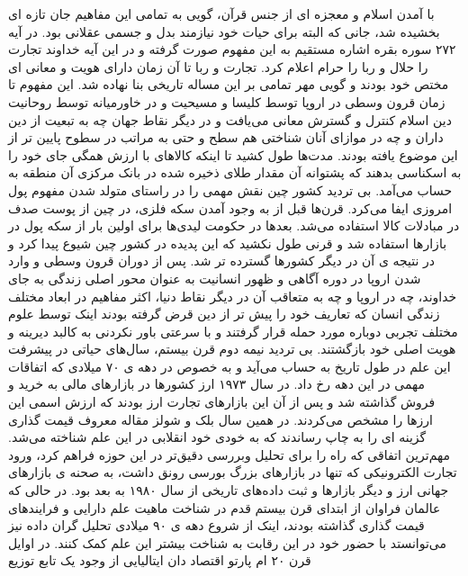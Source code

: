 \documentclass[a4paper,titlepage,12pt,fleqn,oneside]{report}
\begin{document}
با آمدن اسلام و معجزه ای از جنس قرآن، گویی به تمامی این مفاهیم جان تازه ای بخشیده شد، جانی که البته برای حیات خود نیازمند بدل و جسمی عقلانی بود. در آیه ۲۷۲ سوره بقره اشاره مستقیم به این مفهوم صورت گرفته و در این آیه خداوند تجارت را حلال و ربا را حرام اعلام کرد. تجارت و ربا تا آن زمان دارای هویت و معانی ای مختص خود بودند و گویی مهر تمامی بر این مساله تاریخی بنا نهاده شد. این مفهوم تا زمان قرون وسطی در اروپا توسط کلیسا و مسیحیت و در خاورمیانه توسط روحانیت دین اسلام کنترل و گسترش معانی می‌یافت و در دیگر نقاط جهان چه به تبعیت از دین داران و چه در موازای آنان شناختی هم سطح و حتی به مراتب در سطوح پایین تر از این موضوع یافته بودند. مدت‌ها طول کشید تا اینکه کالاهای با ارزش همگی جای خود را به اسکناسی بدهند که پشتوانه آن مقدار طلای ذخیره شده در بانک مرکزی آن  منطقه به حساب می‌آمد. بی تردید کشور چین نقش مهمی را در راستای متولد شدن مفهوم پول امروزی ایفا می‌کرد. قرن‌ها قبل از به وجود آمدن سکه فلزی، در چین از پوست صدف در مبادلات کالا استفاده می‌شد. بعدها در حکومت لیدی‌ها برای اولین بار از سکه پول در بازارها استفاده شد و قرنی طول نکشید که این پدیده در کشور چین شیوع پیدا کرد و در نتیجه ی آن در دیگر کشورها گسترده تر شد. پس از دوران قرون وسطی و وارد شدن اروپا در دوره آگاهی و ظهور انسانیت به عنوان محور اصلی زندگی به جای خداوند، چه در اروپا و چه به متعاقب آن در دیگر نقاط دنیا، اکثر مفاهیم در ابعاد مختلف زندگی انسان که تعاریف خود را پیش تر از دین قرض گرفته بودند اینک توسط علوم مختلف تجربی دوباره مورد حمله قرار گرفتند و با سرعتی باور نکردنی به کالبد دیرینه و هویت اصلی خود بازگشتند.  بی تردید نیمه دوم قرن بیستم، سال‌های حیاتی در پیشرفت این علم در طول تاریخ به حساب می‌آید و به خصوص در دهه ی ۷۰ میلادی که اتفاقات مهمی در این دهه رخ داد. در سال ۱۹۷۳ ارز کشورها در بازارهای مالی به خرید و فروش گذاشته شد و پس از آن این بازارهای تجارت ارز بودند که ارزش اسمی این ارزها را مشخص می‌کردند. 
در همین سال بلک و شولز مقاله معروف قیمت گذاری گزینه ای را به چاپ رساندند\cite{black} که به خودی خود انقلابی در این علم شناخته می‌شد. مهم‌ترین اتفاقی که راه را برای تحلیل وبررسی دقیق‌تر در این حوزه فراهم کرد، ورود تجارت الکترونیکی که تنها در بازارهای بزرگ بورسی رونق داشت، به صحنه ی بازارهای جهانی ارز و دیگر بازارها و ثبت داده‌های تاریخی از سال ۱۹۸۰ به بعد بود.  در حالی که عالمان فراوان از ابتدای قرن بیستم قدم در شناخت ماهیت علم دارایی و فرایندهای قیمت گذاری گذاشته بودند، اینک از شروع دهه ی ۹۰ میلادی تحلیل گران داده نیز می‌توانستد با حضور خود در این رقابت به شناخت بیشتر این علم کمک کنند. 
در اوایل قرن ۲۰ ام پارتو اقتصاد دان ایتالیایی از وجود یک تابع توزیع 
\end{document}
